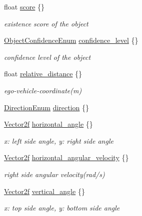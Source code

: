\begin{DoxyCompactItemize}
float \hyperlink{structmaf__perception__interface_1_1ADBObjectData_ae5ae9ae7888cde5de5119387d7cc40bd}{score} \{\}
\begin{DoxyCompactList}\small\item\em existence score of the object \end{DoxyCompactList}\item 
\hyperlink{structmaf__perception__interface_1_1ObjectConfidenceEnum}{Object\+Confidence\+Enum} \hyperlink{structmaf__perception__interface_1_1ADBObjectData_adc1c8476533cffb5d2cf6c02cc802624}{confidence\+\_\+level} \{\}
\begin{DoxyCompactList}\small\item\em confidence level of the object \end{DoxyCompactList}\item 
float \hyperlink{structmaf__perception__interface_1_1ADBObjectData_a0fc4d8dbdebf49c60f932cd38b511492}{relative\+\_\+distance} \{\}
\begin{DoxyCompactList}\small\item\em ego-\/vehicle-\/coordinate(m) \end{DoxyCompactList}\item 
\hyperlink{structmaf__perception__interface_1_1DirectionEnum}{Direction\+Enum} \hyperlink{structmaf__perception__interface_1_1ADBObjectData_ac8cc9c84af4a0ab479bbfe4424bec58b}{direction} \{\}
\item 
\hyperlink{structmaf__perception__interface_1_1Vector2f}{Vector2f} \hyperlink{structmaf__perception__interface_1_1ADBObjectData_a8e3a2a2d306342ae3a1a3eb0af3ce0b8}{horizontal\+\_\+angle} \{\}
\begin{DoxyCompactList}\small\item\em x\+: left side angle, y\+: right side angle \end{DoxyCompactList}\item 
\hyperlink{structmaf__perception__interface_1_1Vector2f}{Vector2f} \hyperlink{structmaf__perception__interface_1_1ADBObjectData_af6ba2d38a3ea97dc573e20ab2b622b06}{horizontal\+\_\+angular\+\_\+velocity} \{\}
\begin{DoxyCompactList}\small\item\em right side angular velocity(rad/s) \end{DoxyCompactList}\item 
\hyperlink{structmaf__perception__interface_1_1Vector2f}{Vector2f} \hyperlink{structmaf__perception__interface_1_1ADBObjectData_a6f1d687f5b10f42b9ddfc58ff2876513}{vertical\+\_\+angle} \{\}
\begin{DoxyCompactList}\small\item\em x\+: top side angle, y\+: bottom side angle \end{DoxyCompactList}\item 

\end{DoxyCompactItemize}
